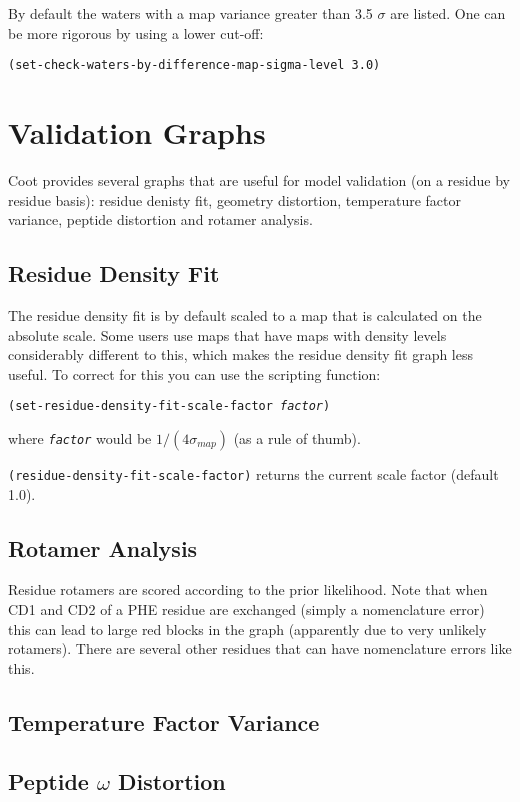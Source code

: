 \documentclass{book}
\begin{document}
By default the waters with a map variance greater than 3.5 $\sigma$ are
listed.  One can be more rigorous by using a lower cut-off:

\texttt{(set-check-waters-by-difference-map-sigma-level 3.0)}


\section{Validation Graphs}

Coot provides several graphs that are useful for model validation (on
a residue by residue basis): residue denisty fit, geometry distortion,
temperature factor variance, peptide distortion and rotamer analysis.

\subsection{Residue Density Fit}

The residue density fit is by default scaled to a map that is
calculated on the absolute scale.  Some users use maps that have maps
with density levels considerably different to this, which makes the
residue density fit graph less useful.  To correct for this you can
use the scripting function:

\texttt{(set-residue-density-fit-scale-factor \emph{factor})}

where \texttt{\emph{factor}} would be $1/(4\sigma_{map})$ (as a rule
of thumb).

\texttt{(residue-density-fit-scale-factor)} returns the current scale
factor (default 1.0).

\subsection{Rotamer Analysis}
Residue rotamers are scored according to the prior likelihood.  Note
that when CD1 and CD2 of a PHE residue are exchanged (simply a
nomenclature error) this can lead to large red blocks in the graph
(apparently due to very unlikely rotamers).  There are several other
residues that can have nomenclature errors like this.

\subsection{Temperature Factor Variance}

\subsection{Peptide $\omega$ Distortion}
\end{document}
